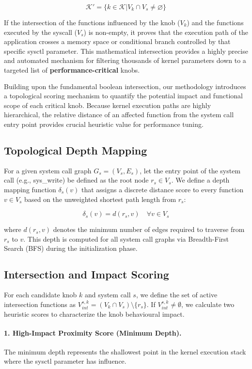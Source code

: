 \[\mathcal{K}' = \{k \in \mathcal{K} | V_k \cap V_s \neq \varnothing \}\]

If the intersection of the functions influenced by the knob ($V_k$) and the functions executed by the syscall ($V_s$) is non-empty, it proves that the execution path of the application crosses a memory space or conditional branch controlled by that specific sysctl parameter.
This mathematical intersection provides a highly precise and automated mechanism for filtering thousands of kernel parameters down to a targeted list of \textbf{performance-critical} knobs.

Building upon the fundamental boolean intersection, our methodology introduces a topological scoring mechanism to quantify the potential impact and functional scope of each critical knob.
Because kernel execution paths are highly hierarchical, the relative distance of an affected function from the system call entry point provides crucial heuristic value for performance tuning.

\subsection{Topological Depth Mapping}

For a given system call graph $G_s = (V_s,E_s)$, let the entry point of the system call (e.g., sys\_write) be defined as the root node $r_s \in V_s$.
We define a depth mapping function $\delta_s(v)$ that assigns a discrete distance score to every function $v \in V_s$ based on the unweighted shortest path length from $r_s$:

\[\delta_s(v) = d(r_s, v) \quad \forall v \in V_s\]

where $d(r_s,v)$ denotes the minimum number of edges required to traverse from $r_s$ to $v$.
This depth is computed for all system call graphs via Breadth-First Search (BFS) during the initialization phase.

\subsection{Intersection and Impact Scoring}

For each candidate knob $k$ and system call $s$, we define the set of active intersection functions as \(V_{int}^{s,k} = (V_k \cap V_s) \setminus \{r_s\}\).
If \(V_{int}^{s,k} \neq \emptyset\), we calculate two heuristic scores to characterize the knob behavioural impact.

\paragraph{1. High-Impact Proximity Score (Minimum Depth).}
The minimum depth represents the shallowest point in the kernel execution stack where the sysctl parameter has influence.

